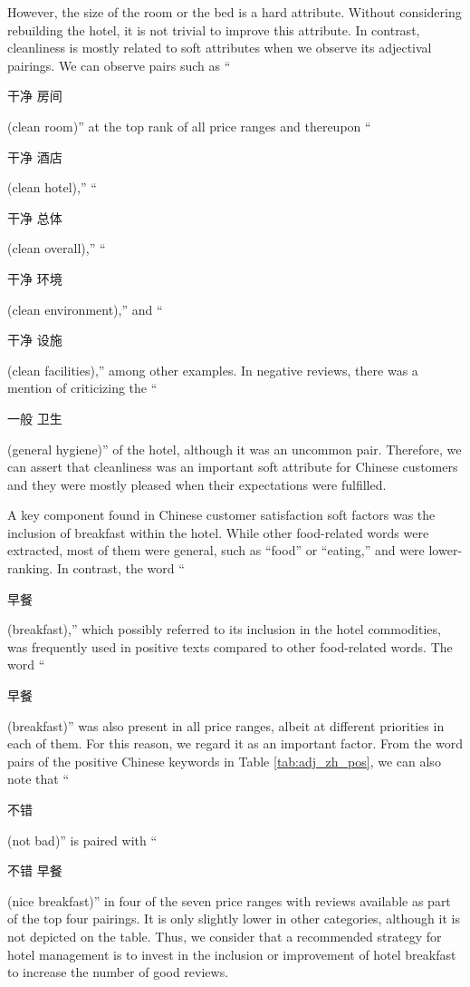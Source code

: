 \documentclass[smallextended,natbib]{svjour3}       %
\begin{document}
    However, the size of the room or the bed is a hard attribute. Without considering rebuilding the hotel, it is not trivial to improve this attribute. In contrast, cleanliness is mostly related to soft attributes when we observe its adjectival pairings. We can observe pairs such as ``\begin{CJK}{UTF8}{gbsn}干净 房间\end{CJK} (clean room)'' at the top rank of all price ranges and thereupon ``\begin{CJK}{UTF8}{gbsn}干净 酒店\end{CJK} (clean hotel),'' ``\begin{CJK}{UTF8}{gbsn}干净 总体\end{CJK} (clean overall),'' ``\begin{CJK}{UTF8}{gbsn}干净 环境\end{CJK} (clean environment),'' and ``\begin{CJK}{UTF8}{gbsn}干净 设施\end{CJK} (clean facilities),'' among other examples. In negative reviews, there was a mention of criticizing the ``\begin{CJK}{UTF8}{gbsn}一般 卫生\end{CJK} (general hygiene)'' of the hotel, although it was an uncommon pair. Therefore, we can assert that cleanliness was an important soft attribute for Chinese customers and they were mostly pleased when their expectations were fulfilled. 

    A key component found in Chinese customer satisfaction soft factors was the inclusion of breakfast within the hotel. While other food-related words were extracted, most of them were general, such as ``food'' or ``eating,'' and were lower-ranking. In contrast, the word ``\begin{CJK}{UTF8}{gbsn}早餐\end{CJK} (breakfast),'' which possibly referred to its inclusion in the hotel commodities, was frequently used in positive texts compared to other food-related words. The word ``\begin{CJK}{UTF8}{gbsn}早餐\end{CJK} (breakfast)'' was also present in all price ranges, albeit at different priorities in each of them. For this reason, we regard it as an important factor. From the word pairs of the positive Chinese keywords in Table \ref{tab:adj_zh_pos}, we can also note that ``\begin{CJK}{UTF8}{gbsn}不错\end{CJK} (not bad)'' is paired with ``\begin{CJK}{UTF8}{gbsn}不错 早餐\end{CJK} (nice breakfast)'' in four of the seven price ranges with reviews available as part of the top four pairings. It is only slightly lower in other categories, although it is not depicted on the table. Thus, we consider that a recommended strategy for hotel management is to invest in the inclusion or improvement of hotel breakfast to increase the number of good reviews.
\end{document}
